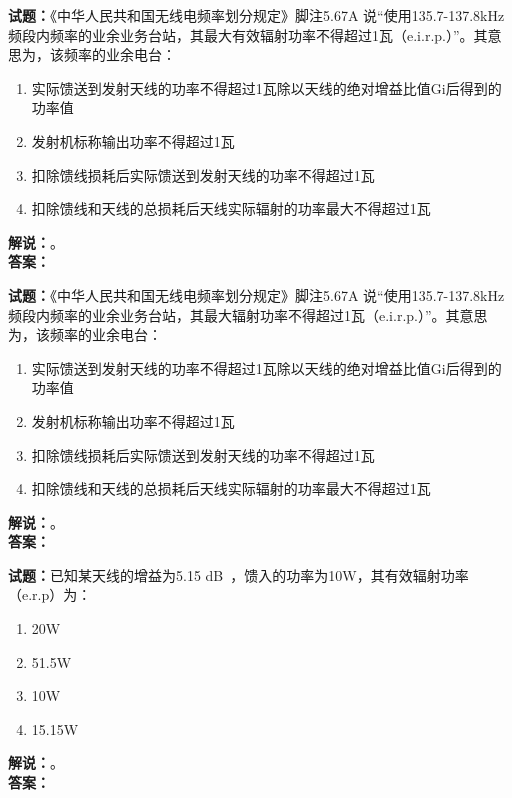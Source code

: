 \documentclass{ctexbook}
\begin{document}
\bigskip




\noindent\textbf{试题：}《中华人民共和国无线电频率划分规定》脚注5.67A 说“使用135.7-137.8\unit{\kHz}频段内频率的业余业务台站，其最大有效辐射功率不得超过1瓦（e.i.r.p.）”。其意思为，该频率的业余电台：
\begin{enumerate}[leftmargin=3em]
\item 实际馈送到发射天线的功率不得超过1瓦除以天线的绝对增益比值Gi后得到的功率值
\item 发射机标称输出功率不得超过1瓦
\item 扣除馈线损耗后实际馈送到发射天线的功率不得超过1瓦
\item 扣除馈线和天线的总损耗后天线实际辐射的功率最大不得超过1瓦
\end{enumerate}
\noindent\textbf{解说：}\textbf{}。\\\noindent\textbf{答案：}

\bigskip




\noindent\textbf{试题：}《中华人民共和国无线电频率划分规定》脚注5.67A 说“使用135.7-137.8\unit{\kHz}频段内频率的业余业务台站，其最大辐射功率不得超过1瓦（e.i.r.p.）”。其意思为，该频率的业余电台：
\begin{enumerate}[leftmargin=3em]
\item 实际馈送到发射天线的功率不得超过1瓦除以天线的绝对增益比值Gi后得到的功率值
\item 发射机标称输出功率不得超过1瓦
\item 扣除馈线损耗后实际馈送到发射天线的功率不得超过1瓦
\item 扣除馈线和天线的总损耗后天线实际辐射的功率最大不得超过1瓦
\end{enumerate}
\noindent\textbf{解说：}\textbf{}。\\\noindent\textbf{答案：}

\bigskip




\noindent\textbf{试题：}已知某天线的增益为5.15 \unit[qualifier-mode=combine]{\deci\bel{}}，馈入的功率为10W，其有效辐射功率（e.r.p）为：
\begin{enumerate}[leftmargin=3em]
\item 20W
\item 51.5W
\item 10W
\item 15.15W
\end{enumerate}
\noindent\textbf{解说：}\textbf{}。\\\noindent\textbf{答案：}
\end{document}
